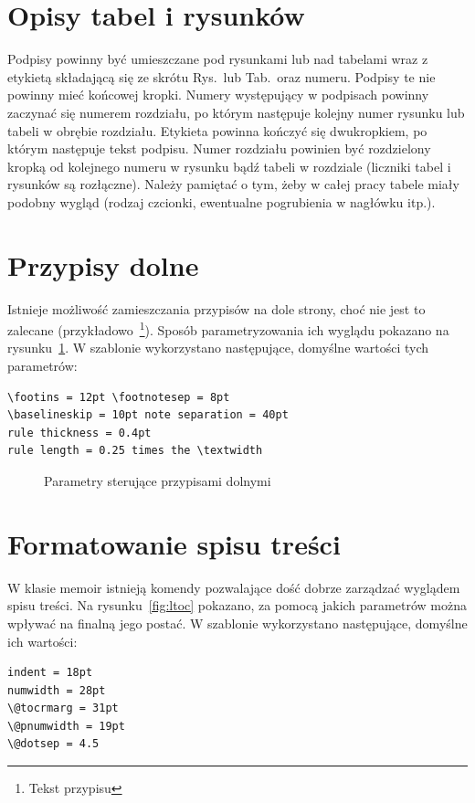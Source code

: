 \section{Opisy tabel i rysunków}
Podpisy powinny być umieszczane pod rysunkami lub nad tabelami wraz z etykietą składającą się ze skrótu Rys.\ lub Tab.\ oraz numeru. Podpisy te nie powinny mieć końcowej kropki. Numery występujący w podpisach powinny zaczynać się numerem rozdziału, po którym następuje kolejny numer rysunku lub tabeli w obrębie rozdziału. Etykieta powinna kończyć się dwukropkiem, po którym następuje tekst podpisu. Numer rozdziału powinien być rozdzielony kropką od kolejnego numeru w rysunku bądź tabeli w rozdziale (liczniki tabel i rysunków są rozłączne). Należy pamiętać o tym, żeby w całej pracy tabele miały podobny wygląd (rodzaj czcionki, ewentualne pogrubienia w nagłówku itp.). %

\section{Przypisy dolne}
Istnieje możliwość zamieszczania przypisów na dole strony, choć nie jest to zalecane (przykładowo~\footnote{Tekst przypisu}). Sposób parametryzowania ich wyglądu pokazano na rysunku~\ref{fig:fp}. W szablonie wykorzystano następujące, domyślne wartości tych parametrów:
\begin{lstlisting}[basicstyle=\footnotesize\ttfamily]
\footins = 12pt \footnotesep = 8pt
\baselineskip = 10pt note separation = 40pt
rule thickness = 0.4pt
rule length = 0.25 times the \textwidth
\end{lstlisting}
\begin{figure}[htb]
\drawfootnote
\caption{Parametry sterujące przypisami dolnymi} \label{fig:fp}
\end{figure}


\section{Formatowanie spisu treści}
W klasie memoir istnieją komendy pozwalające dość dobrze zarządzać wyglądem spisu treści. Na rysunku~\ref{fig:ltoc} pokazano, za pomocą jakich parametrów można wpływać na finalną jego postać. W szablonie wykorzystano następujące, domyślne ich wartości:
\begin{lstlisting}[basicstyle=\footnotesize\ttfamily]
indent = 18pt 
numwidth = 28pt
\@tocrmarg = 31pt 
\@pnumwidth = 19pt
\@dotsep = 4.5
\end{lstlisting}

